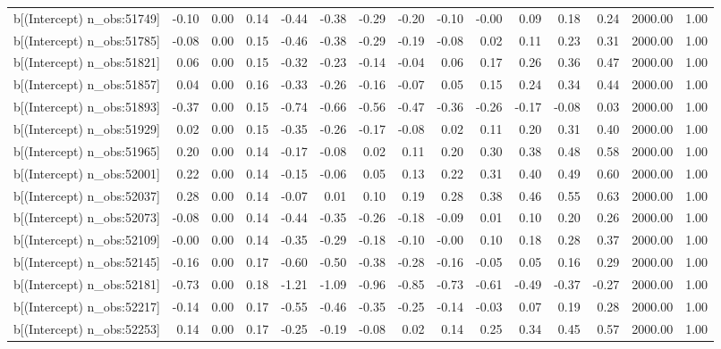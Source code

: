\begin{table}[ht]
\begin{tabular}{rrrrrrrrrrrrrrr}
  b[(Intercept) n\_obs:51749] & -0.10 & 0.00 & 0.14 & -0.44 & -0.38 & -0.29 & -0.20 & -0.10 & -0.00 & 0.09 & 0.18 & 0.24 & 2000.00 & 1.00 \\ 
  b[(Intercept) n\_obs:51785] & -0.08 & 0.00 & 0.15 & -0.46 & -0.38 & -0.29 & -0.19 & -0.08 & 0.02 & 0.11 & 0.23 & 0.31 & 2000.00 & 1.00 \\ 
  b[(Intercept) n\_obs:51821] & 0.06 & 0.00 & 0.15 & -0.32 & -0.23 & -0.14 & -0.04 & 0.06 & 0.17 & 0.26 & 0.36 & 0.47 & 2000.00 & 1.00 \\ 
  b[(Intercept) n\_obs:51857] & 0.04 & 0.00 & 0.16 & -0.33 & -0.26 & -0.16 & -0.07 & 0.05 & 0.15 & 0.24 & 0.34 & 0.44 & 2000.00 & 1.00 \\ 
  b[(Intercept) n\_obs:51893] & -0.37 & 0.00 & 0.15 & -0.74 & -0.66 & -0.56 & -0.47 & -0.36 & -0.26 & -0.17 & -0.08 & 0.03 & 2000.00 & 1.00 \\ 
  b[(Intercept) n\_obs:51929] & 0.02 & 0.00 & 0.15 & -0.35 & -0.26 & -0.17 & -0.08 & 0.02 & 0.11 & 0.20 & 0.31 & 0.40 & 2000.00 & 1.00 \\ 
  b[(Intercept) n\_obs:51965] & 0.20 & 0.00 & 0.14 & -0.17 & -0.08 & 0.02 & 0.11 & 0.20 & 0.30 & 0.38 & 0.48 & 0.58 & 2000.00 & 1.00 \\ 
  b[(Intercept) n\_obs:52001] & 0.22 & 0.00 & 0.14 & -0.15 & -0.06 & 0.05 & 0.13 & 0.22 & 0.31 & 0.40 & 0.49 & 0.60 & 2000.00 & 1.00 \\ 
  b[(Intercept) n\_obs:52037] & 0.28 & 0.00 & 0.14 & -0.07 & 0.01 & 0.10 & 0.19 & 0.28 & 0.38 & 0.46 & 0.55 & 0.63 & 2000.00 & 1.00 \\ 
  b[(Intercept) n\_obs:52073] & -0.08 & 0.00 & 0.14 & -0.44 & -0.35 & -0.26 & -0.18 & -0.09 & 0.01 & 0.10 & 0.20 & 0.26 & 2000.00 & 1.00 \\ 
  b[(Intercept) n\_obs:52109] & -0.00 & 0.00 & 0.14 & -0.35 & -0.29 & -0.18 & -0.10 & -0.00 & 0.10 & 0.18 & 0.28 & 0.37 & 2000.00 & 1.00 \\ 
  b[(Intercept) n\_obs:52145] & -0.16 & 0.00 & 0.17 & -0.60 & -0.50 & -0.38 & -0.28 & -0.16 & -0.05 & 0.05 & 0.16 & 0.29 & 2000.00 & 1.00 \\ 
  b[(Intercept) n\_obs:52181] & -0.73 & 0.00 & 0.18 & -1.21 & -1.09 & -0.96 & -0.85 & -0.73 & -0.61 & -0.49 & -0.37 & -0.27 & 2000.00 & 1.00 \\ 
  b[(Intercept) n\_obs:52217] & -0.14 & 0.00 & 0.17 & -0.55 & -0.46 & -0.35 & -0.25 & -0.14 & -0.03 & 0.07 & 0.19 & 0.28 & 2000.00 & 1.00 \\ 
  b[(Intercept) n\_obs:52253] & 0.14 & 0.00 & 0.17 & -0.25 & -0.19 & -0.08 & 0.02 & 0.14 & 0.25 & 0.34 & 0.45 & 0.57 & 2000.00 & 1.00 \\ 

\end{tabular}
\end{table}

